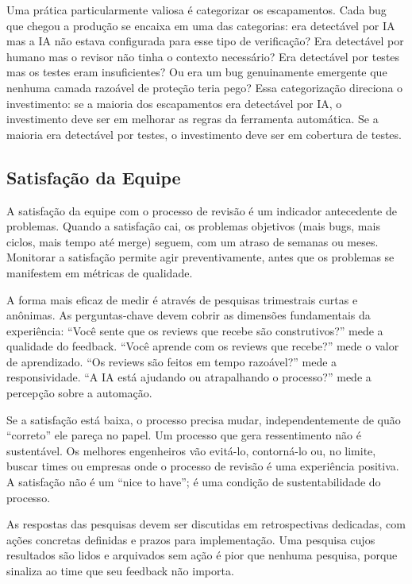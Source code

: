 Uma prática particularmente valiosa é categorizar os escapamentos. Cada bug que
chegou a produção se encaixa em uma das categorias: era detectável por IA mas a
IA não estava configurada para esse tipo de verificação? Era detectável por humano
mas o revisor não tinha o contexto necessário? Era detectável por testes mas os
testes eram insuficientes? Ou era um bug genuinamente emergente que nenhuma camada
razoável de proteção teria pego? Essa categorização direciona o investimento: se a
maioria dos escapamentos era detectável por IA, o investimento deve ser em melhorar
as regras da ferramenta automática. Se a maioria era detectável por testes, o
investimento deve ser em cobertura de testes.

\subsection{Satisfação da Equipe}

A satisfação da equipe com o processo de revisão é um indicador antecedente de
problemas. Quando a satisfação cai, os problemas objetivos (mais bugs, mais ciclos,
mais tempo até merge) seguem, com um atraso de semanas ou meses. Monitorar
a satisfação permite agir preventivamente, antes que os problemas se manifestem em
métricas de qualidade.

A forma mais eficaz de medir é através de pesquisas trimestrais curtas e anônimas.
As perguntas-chave devem cobrir as dimensões fundamentais da experiência: ``Você
sente que os reviews que recebe são construtivos?'' mede a qualidade do feedback.
``Você aprende com os reviews que recebe?'' mede o valor de aprendizado. ``Os reviews
são feitos em tempo razoável?'' mede a responsividade. ``A IA está ajudando ou
atrapalhando o processo?'' mede a percepção sobre a automação.

Se a satisfação está baixa, o processo precisa mudar, independentemente de quão
``correto'' ele pareça no papel. Um processo que gera ressentimento não é sustentável.
Os melhores engenheiros vão evitá-lo, contorná-lo ou, no limite, buscar times ou
empresas onde o processo de revisão é uma experiência positiva. A satisfação não é
um ``nice to have''; é uma condição de sustentabilidade do processo.

As respostas das pesquisas devem ser discutidas em retrospectivas dedicadas, com
ações concretas definidas e prazos para implementação. Uma pesquisa cujos resultados
são lidos e arquivados sem ação é pior que nenhuma pesquisa, porque sinaliza ao time
que seu feedback não importa.

